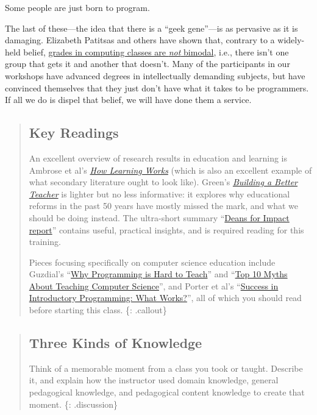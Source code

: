 Some people are just born to program.

The last of these---the idea that there is a ``geek gene''---is as
pervasive as it is damaging. Elizabeth Patitsas and others have shown
that, contrary to a widely-held belief,
\href{http://dl.acm.org/citation.cfm?id=2960312}{grades in computing
classes are \emph{not} bimodal}, i.e., there isn't one group that gets
it and another that doesn't. Many of the participants in our workshops
have advanced degrees in intellectually demanding subjects, but have
convinced themselves that they just don't have what it takes to be
programmers. If all we do is dispel that belief, we will have done them
a service.

\begin{quote}
\subsection{Key Readings}\label{key-readings}

An excellent overview of research results in education and learning is
Ambrose et al's
\emph{\href{http://www.amazon.com/How-Learning-Works-Research-Based-Jossey-Bass/dp/0470484101/}{How
Learning Works}} (which is also an excellent example of what secondary
literature ought to look like). Green's
\emph{\href{http://www.amazon.com/Building-Better-Teacher-Teaching-Everyone/dp/0393081591/}{Building
a Better Teacher}} is lighter but no less informative: it explores why
educational reforms in the past 50 years have mostly missed the mark,
and what we should be doing instead. The ultra-short summary
``\href{\{\{\%20page.root\%20\}\}/files/papers/science-of-learning-2015.pdf}{Deans
for Impact report}'' contains useful, practical insights, and is
required reading for this training.

Pieces focusing specifically on computer science education include
Guzdial's
``\href{\{\{\%20page.root\%20\}\}/files/papers/guzdial-why-hard-to-teach-2011.pdf}{Why
Programming is Hard to Teach}'' and
``\href{\{\{\%20page.root\%20\}\}/files/papers/guzdial-10-myths-2015.pdf}{Top
10 Myths About Teaching Computer Science}'', and Porter et al's
``\href{\{\{\%20page.root\%20\}\}/files/papers/porter-what-works-2013.pdf}{Success
in Introductory Programming: What Works?}'', all of which you should
read before starting this class. \{: .callout\}
\end{quote}

\begin{quote}
\subsection{Three Kinds of Knowledge}\label{three-kinds-of-knowledge}

Think of a memorable moment from a class you took or taught. Describe
it, and explain how the instructor used domain knowledge, general
pedagogical knowledge, and pedagogical content knowledge to create that
moment. \{: .discussion\}
\end{quote}

